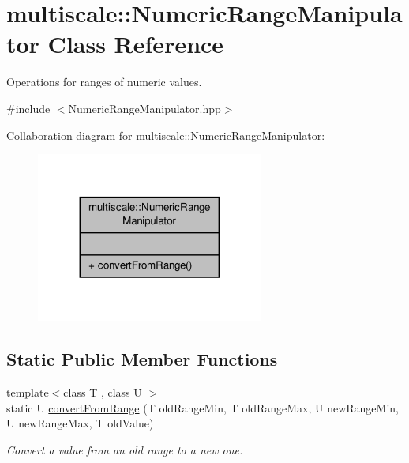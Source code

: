 \hypertarget{classmultiscale_1_1NumericRangeManipulator}{\section{multiscale\-:\-:Numeric\-Range\-Manipulator Class Reference}
\label{classmultiscale_1_1NumericRangeManipulator}
}


Operations for ranges of numeric values.  




{\ttfamily \#include $<$Numeric\-Range\-Manipulator.\-hpp$>$}



Collaboration diagram for multiscale\-:\-:Numeric\-Range\-Manipulator\-:
\nopagebreak
\begin{figure}[H]
\begin{center}
\leavevmode
\includegraphics[width=212pt]{classmultiscale_1_1NumericRangeManipulator__coll__graph}
\end{center}
\end{figure}
\subsection*{Static Public Member Functions}
\begin{DoxyCompactItemize}
\item 
{\footnotesize template$<$class T , class U $>$ }\\static U \hyperlink{classmultiscale_1_1NumericRangeManipulator_a4459c449fb7ebc07bcb8934d3a860e7e}{convert\-From\-Range} (T old\-Range\-Min, T old\-Range\-Max, U new\-Range\-Min, U new\-Range\-Max, T old\-Value)
\begin{DoxyCompactList}\small\item\em Convert a value from an old range to a new one. \end{DoxyCompactList}\end{DoxyCompactItemize}


